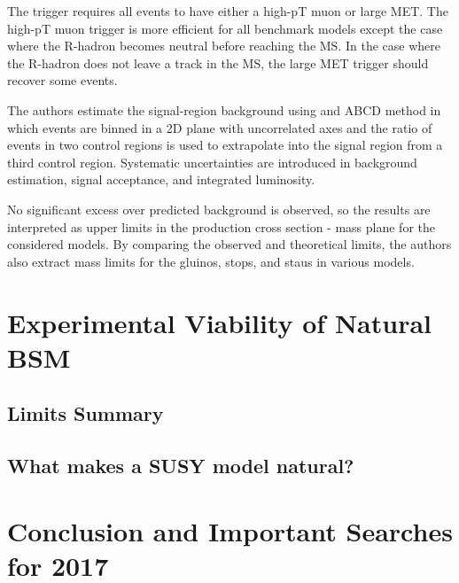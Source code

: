 \documentclass[12pt]{article}
\begin{document}
            The trigger requires all events to have either a high-pT muon or large MET. The high-pT muon trigger is more efficient for all benchmark models except the case where the R-hadron becomes neutral before reaching the MS. In the case where the R-hadron does not leave a track in the MS, the large MET trigger should recover some events.  

            The authors estimate the signal-region background using and ABCD method in which events are binned in a 2D plane with uncorrelated axes and the ratio of events in two control regions is used to extrapolate into the signal region from a third control region. Systematic uncertainties are introduced in background estimation, signal acceptance, and integrated luminosity.

            No significant excess over predicted background is observed, so the results are interpreted as upper limits in the production cross section - mass plane for the considered models. By comparing the observed and theoretical limits, the authors also extract mass limits for the gluinos, stops, and staus in various models.

\section{Experimental Viability of Natural BSM}
\subsection{Limits Summary}
\subsection{What makes a SUSY model natural?}

\section{Conclusion and Important Searches for 2017}

\clearpage
\pagebreak
\singlespacing
{}

\end{document}
